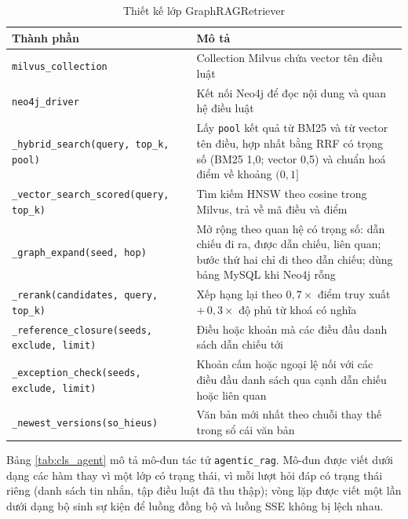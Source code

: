 \documentclass[../DoAn.tex]{subfiles}
\begin{document}
\begin{table}[H]
\centering
\caption{Thiết kế lớp GraphRAGRetriever}
\label{tab:cls_retriever}
\begin{tabular}{|L{4.6cm}|L{9.4cm}|}
\hline
\textbf{Thành phần} & \textbf{Mô tả} \\ \hline
\texttt{milvus\_collection} & Collection Milvus chứa vector tên điều luật \\ \hline
\texttt{neo4j\_driver} & Kết nối Neo4j để đọc nội dung và quan hệ điều luật \\ \hline
\texttt{\_hybrid\_search(}\allowbreak\texttt{query,}\allowbreak\texttt{ top\_k,}\allowbreak\texttt{ pool)} & Lấy \texttt{pool} kết quả từ BM25 và từ vector tên điều, hợp nhất bằng RRF có trọng số (BM25 1,0; vector 0,5) và chuẩn hoá điểm về khoảng $(0, 1]$ \\ \hline
\texttt{\_vector\_search\_scored(}\allowbreak\texttt{query,}\allowbreak\texttt{ top\_k)} & Tìm kiếm HNSW theo cosine trong Milvus, trả về mã điều và điểm \\ \hline
\texttt{\_graph\_expand(}\allowbreak\texttt{seed,}\allowbreak\texttt{ hop)} & Mở rộng theo quan hệ có trọng số: dẫn chiếu đi ra, được dẫn chiếu, liên quan; bước thứ hai chỉ đi theo dẫn chiếu; dùng bảng MySQL khi Neo4j rỗng \\ \hline
\texttt{\_rerank(}\allowbreak\texttt{candidates,}\allowbreak\texttt{ query,}\allowbreak\texttt{ top\_k)} & Xếp hạng lại theo $0{,}7\times$ điểm truy xuất $+\, 0{,}3\times$ độ phủ từ khoá có nghĩa \\ \hline
\texttt{\_reference\_closure(}\allowbreak\texttt{seeds,}\allowbreak\texttt{ exclude,}\allowbreak\texttt{ limit)} & Điều hoặc khoản mà các điều đầu danh sách dẫn chiếu tới \\ \hline
\texttt{\_exception\_check(}\allowbreak\texttt{seeds,}\allowbreak\texttt{ exclude,}\allowbreak\texttt{ limit)} & Khoản cấm hoặc ngoại lệ nối với các điều đầu danh sách qua cạnh dẫn chiếu hoặc liên quan \\ \hline
\texttt{\_newest\_versions(}\allowbreak\texttt{so\_hieus)} & Văn bản mới nhất theo chuỗi thay thế trong sổ cái văn bản \\ \hline
\end{tabular}
\end{table}

Bảng \ref{tab:cls_agent} mô tả mô-đun tác tử \texttt{agentic\_rag}. Mô-đun được viết dưới dạng các hàm thay vì một lớp có trạng thái, vì mỗi lượt hỏi đáp có trạng thái riêng (danh sách tin nhắn, tập điều luật đã thu thập); vòng lặp được viết một lần dưới dạng bộ sinh sự kiện để luồng đồng bộ và luồng SSE không bị lệch nhau.
\end{document}
